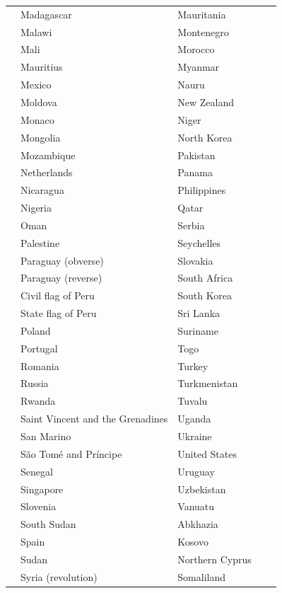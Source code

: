 \documentclass[11pt]{amsart}
\begin{document}
\begin{table}[h]
\begin{tabular}{lllll}
        & Madagascar & Mauritania & & \\
        & Malawi & Montenegro & & \\
        & Mali & Morocco & & \\
        & Mauritius & Myanmar & & \\
        & Mexico & Nauru & & \\
        & Moldova & New Zealand & & \\
        & Monaco & Niger & & \\
        & Mongolia & North Korea & & \\
        & Mozambique & Pakistan & & \\
        & Netherlands & Panama & & \\
        & Nicaragua & Philippines & & \\
        & Nigeria & Qatar & & \\
        & Oman & Serbia & & \\
        & Palestine & Seychelles & & \\
        & Paraguay (obverse) & Slovakia & & \\
        & Paraguay (reverse) & South Africa & & \\
        & Civil flag of Peru & South Korea & & \\
        & State flag of Peru & Sri Lanka & & \\
        & Poland & Suriname & & \\
        & Portugal & Togo & & \\
        & Romania & Turkey & & \\
        & Russia & Turkmenistan & & \\
        & Rwanda & Tuvalu & & \\
        & Saint Vincent and the Grenadines & Uganda & & \\
        & San Marino & Ukraine & & \\
        & São Tomé and Príncipe & United States & & \\
        & Senegal & Uruguay & & \\
        & Singapore & Uzbekistan & & \\
        & Slovenia & Vanuatu & & \\
        & South Sudan & Abkhazia & & \\
        & Spain & Kosovo & & \\
        & Sudan & Northern Cyprus & & \\
        & Syria (revolution) & Somaliland & & \\

\end{tabular}
\end{table}
\end{document}
